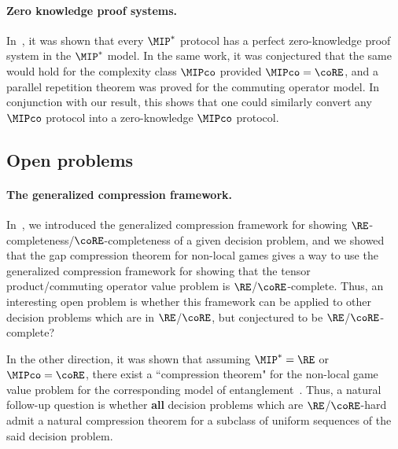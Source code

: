 
\paragraph{Zero knowledge proof systems. } In~\cite{mastelTwoProverPerfect2024a}, it was shown that every $\MIP^*$ protocol has a perfect zero-knowledge proof system in the $\MIP^*$ model. In the same work, it was conjectured that the same would hold for the complexity class $\MIPco$ provided $\MIPco=\coRE$, and a parallel repetition theorem was proved for the commuting operator model. In conjunction with our result, this shows that one could similarly convert any $\MIPco$ protocol into a zero-knowledge $\MIPco$ protocol.






\subsection{Open problems}

\paragraph{The generalized compression framework. } In~, we introduced the generalized compression framework for showing $\RE$-completeness/$\coRE$-completeness of a given decision problem, and we showed that the gap compression theorem for non-local games gives a way to use the generalized compression framework for showing that the tensor product/commuting operator value problem is $\RE$/$\coRE$-complete. Thus, an interesting open problem is whether this framework can be applied to other decision problems which are in $\RE$/$\coRE$, but conjectured to be $\RE$/$\coRE$-complete?

In the other direction, it was shown that assuming $\MIP^*=\RE$ or $\MIPco=\coRE$, there exist a ``compression theorem" for the non-local game value problem for the corresponding model of entanglement~\cite{mousaviNonlocalGamesCompression2022, mousaviComplexityZeroGap2020}. Thus, a natural follow-up question is whether \textbf{all} decision problems which are $\RE$/$\coRE$-hard admit a natural compression theorem for a subclass of uniform sequences of the said decision problem. 

